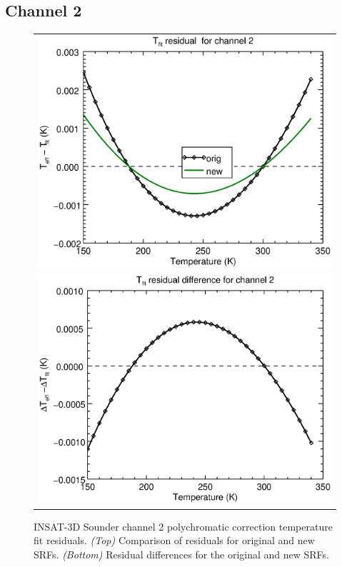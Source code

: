 \subsection{Channel 2}
\begin{figure}[H]
  \centering
  \begin{tabular}{c}
    \includegraphics[scale=0.55]{graphics/sndr/tfit/sndr_insat3d-2.tfit.eps} \\
    \includegraphics[scale=0.55]{graphics/sndr/tfit/sndr_insat3d-2.tfit.difference.eps}
  \end{tabular}
  \caption{INSAT-3D Sounder channel 2 polychromatic correction temperature fit residuals. \emph{(Top)} Comparison of residuals for original and new SRFs. \emph{(Bottom)} Residual differences for the original and new SRFs.}
  \label{fig:sndr_ch2_tfit}
\end{figure}

